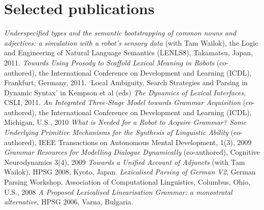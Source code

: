 \documentclass[a4paper]{article}
\begin{document}
\section*{Selected publications}

{\em Underspecified types and the semantic bootstrapping of common nouns and adjectives: a simulation with a robot's sensory data} (with Tam Wailok), the Logic and Engineering of Natural Language Semantics (LENLS8), Takamatsu, Japan, 2011.\smallskip\newline
{\em Towards Using Prosody to Scaffold Lexical Meaning in Robots} (co-authored), the International Conference on Development and Learning (ICDL), Frankfurt, Germany, 2011.\smallskip\newline
`Local Ambiguity, Search Strategies and Parsing in Dynamic Syntax' in
Kempson et al (eds) {\em The Dynamics of Lexical Interfaces}, CSLI, 2011.\smallskip\newline
{\em An Integrated Three-Stage Model towards Grammar Acquisition} (co-authored), the International Conference on Development and Learning (ICDL), Michigan, U.S., 2010\smallskip\newline
{\em What is Needed for a Robot to Acquire Grammar? Some Underlying Primitive Mechanisms for the Synthesis of Linguistic Ability} (co-authored), IEEE Transactions on Autonomous Mental Development, 1(3), 2009\smallskip\newline
{\em Grammar Resources for Modelling Dialogue Dynamically} (co-authored), Cognitive Neurodynamics 3(4), 2009\smallskip\newline
{\em Towards a Unified Account of Adjuncts} (with Tam Wailok), HPSG 2008, Kyoto, Japan.\smallskip\newline
{\em Lexicalised Parsing of German V2}, German Parsing Workshop, Association of Computational Linguistics, Columbus, Ohio, U.S., 2008\smallskip\newline
{\em A Proposed Lexicalised Linearisation Grammar: a monostratal alternative}, HPSG 2006, Varna, Bulgaria.\smallskip\newline
\end{document}
